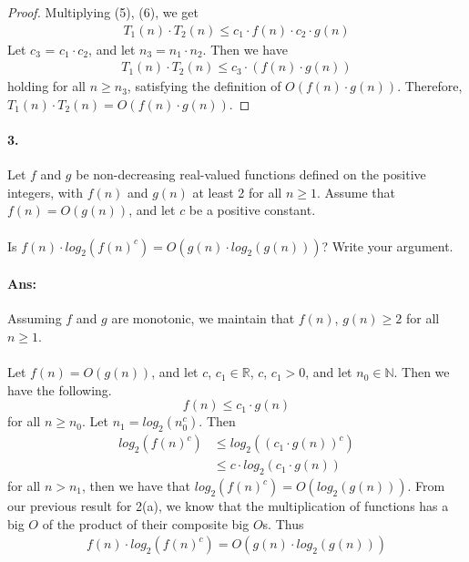 \documentclass{article}
\begin{document}
\begin{enumerate}[label=(\alph*).]
\begin{proof}
                Multiplying (5), (6), we get
                \begin{align*}
                    T_1(n) \cdot T_2(n) \le c_1 \cdot f(n) \cdot c_2 \cdot g(n)
                \end{align*}
                Let $c_3$ = $c_1 \cdot c_2$, and let $n_3 = n_1\cdot n_2$. Then we have
                \begin{align*}
                    T_1(n) \cdot T_2(n) \le c_3 \cdot (f(n) \cdot g(n))
                \end{align*}
                holding for all $n \ge n_3$, satisfying the definition of $O(f(n)\cdot g(n))$. Therefore, 
                $T_1(n)\cdot T_2(n) = O(f(n)\cdot g(n))$.
            \end{proof}
        \end{enumerate}
\paragraph{3.} Let $f$ and $g$ be non-decreasing real-valued functions defined on the positive integers, with
$f(n)$ and $g(n)$ at least 2 for all $n \ge 1$. Assume that $f(n) = O(g(n))$, and let $c$ be a positive constant.


\paragraph{}Is $f(n)\cdot log_{2}(f(n)^{c}) = O(g(n)\cdot log_{2}(g(n)))$? Write your argument.

\paragraph{Ans:} Assuming $f$ and $g$ are monotonic, we maintain that $f(n)$, $g(n) \ge 2$ for all $n \ge 1$.

\paragraph{} Let $f(n) = O(g(n))$, and let $c$, $c_1 \in \mathbb{R}$, $c$, $c_1 > 0$, and let $n_0 \in
\mathbb{N}$. Then we have the following.
\begin{equation}
    f(n) \le c_1 \cdot g(n)
\end{equation}
for all $n \ge n_0$.
Let $n_1 = log_2(n_{0}^{c})$. Then
\begin{align*}
    log_2(f(n)^c) &\le log_2((c_1 \cdot g(n))^c) \\
                  &\le c \cdot log_2(c_1 \cdot g(n))
\end{align*}
for all $n > n_1$, 
then we have that $log_2(f(n)^c) = O(log_2(g(n)))$.
From our previous result for 2(a), we know that the multiplication of functions has a big $O$ of the
product of their composite big $O$s. Thus
\begin{align*}
    f(n) \cdot log_2(f(n)^c) = O(g(n)\cdot log_2(g(n)))
\end{align*}
\end{document}
